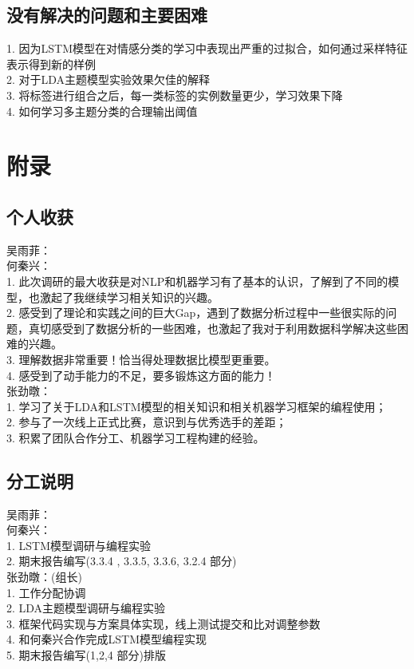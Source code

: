 \documentclass[a4paper]{article}
\begin{document}
   	\subsection{没有解决的问题和主要困难}
	\noindent
 	\large
 	1. 因为LSTM模型在对情感分类的学习中表现出严重的过拟合，如何通过采样特征表示得到新的样例 \\
 	2. 对于LDA主题模型实验效果欠佳的解释 \\
 	3. 将标签进行组合之后，每一类标签的实例数量更少，学习效果下降 \\
 	4. 如何学习多主题分类的合理输出阈值 

   \section{附录}
    \subsection{个人收获}
    \noindent
    吴雨菲：\\
    何秦兴：\\
    1. 此次调研的最大收获是对NLP和机器学习有了基本的认识，了解到了不同的模型，也激起了我继续学习相关知识的兴趣。  \\
	2. 感受到了理论和实践之间的巨大Gap，遇到了数据分析过程中一些很实际的问题，真切感受到了数据分析的一些困难，也激起了我对于利用数据科学解决这些困难的兴趣。\\
	3. 理解数据非常重要！恰当得处理数据比模型更重要。\\
	4. 感受到了动手能力的不足，要多锻炼这方面的能力！\\[10pt]
    张劲暾：\\
    1. 学习了关于LDA和LSTM模型的相关知识和相关机器学习框架的编程使用； \\
    2. 参与了一次线上正式比赛，意识到与优秀选手的差距；\\
    3. 积累了团队合作分工、机器学习工程构建的经验。
   	\subsection{分工说明}
   	\noindent
 	吴雨菲：\\
    何秦兴：\\
    1. LSTM模型调研与编程实验\\
    2. 期末报告编写(3.3.4 , 3.3.5, 3.3.6, 3.2.4 部分)\\[10pt]
    张劲暾：(组长)\\
    1. 工作分配协调\\
    2. LDA主题模型调研与编程实验 \\
    3. 框架代码实现与方案具体实现，线上测试提交和比对调整参数 \\
    4. 和何秦兴合作完成LSTM模型编程实现 \\
    5. 期末报告编写(1,2,4 部分)排版 \\
\end{document}
